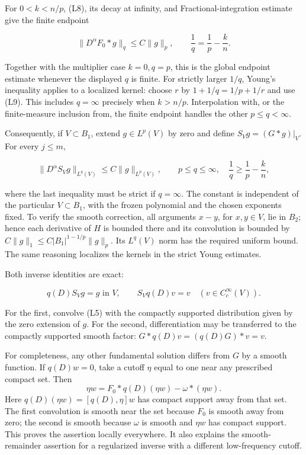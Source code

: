 \documentclass[
  11pt,
]{article}
\begin{document}
For \(0<k<n/p\), (L8), its decay at infinity, and Fractional-integration
estimate give the finite endpoint

\[
\|D^\alpha F_0*g\|_q\leq C\|g\|_p,
\qquad \frac1q=\frac1p-\frac{k}{n}.                              \tag{L10}
\]

Together with the multiplier case \(k=0,q=p\), this is the global
endpoint estimate whenever the displayed \(q\) is finite. For strictly
larger \(1/q\), Young's inequality applies to a localized kernel: choose
\(r\) by \(1+1/q=1/p+1/r\) and use (L9). This includes \(q=\infty\)
precisely when \(k>n/p\). Interpolation with, or the finite-measure
inclusion from, the finite endpoint handles the other
\(p\leq q<\infty\).

Consequently, if \(V\subset B_1\), extend \(g\in L^p(V)\) by zero and
define \(S_Vg=(G*g)|_V\). For every \(j\leq m\),

\[
\|D^\alpha S_Vg\|_{L^q(V)}\leq C\|g\|_{L^p(V)},\qquad
p\leq q\leq\infty,\quad
\frac1q\geq\frac1p-\frac{k}{n},                                  \tag{L11}
\]

where the last inequality must be strict if \(q=\infty\). The constant
is independent of the particular \(V\subset B_1\), with the frozen
polynomial and the chosen exponents fixed. To verify the smooth
correction, all arguments \(x-y\), for \(x,y\in V\), lie in \(B_2\);
hence each derivative of \(H\) is bounded there and its convolution is
bounded by \(C\|g\|_1\leq C|B_1|^{1-1/p}\|g\|_p\). Its \(L^q(V)\) norm
has the required uniform bound. The same reasoning localizes the kernels
in the strict Young estimates.

Both inverse identities are exact:

\[
q(D)S_Vg=g\text{ in }V,\qquad S_Vq(D)v=v\quad(v\in C_c^\infty(V)).
                                                                    \tag{L12}
\]

For the first, convolve (L5) with the compactly supported distribution
given by the zero extension of \(g\). For the second, differentiation
may be transferred to the compactly supported smooth factor:
\(G*q(D)v=(q(D)G)*v=v\).

For completeness, any other fundamental solution differs from \(G\) by a
smooth function. If \(q(D)w=0\), take a cutoff \(\eta\) equal to one
near any prescribed compact set. Then \[
\eta w=F_0*q(D)(\eta w)-\omega*(\eta w).
\] Here \(q(D)(\eta w)=[q(D),\eta]w\) has compact support away from that
set. The first convolution is smooth near the set because \(F_0\) is
smooth away from zero; the second is smooth because \(\omega\) is smooth
and \(\eta w\) has compact support. This proves the assertion locally
everywhere. It also explains the smooth-remainder assertion for a
regularized inverse with a different low-frequency cutoff.
\end{document}
